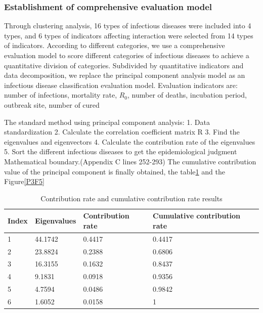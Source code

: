\documentclass[a4paper, 11pt,twoside=true]{scrartcl}
\begin{document}
\subsubsection{Establishment of comprehensive evaluation model}
\qquad Through clustering analysis, 16 types of infectious diseases were included into 4 types, and 6 types of indicators affecting interaction were selected from 14 types of indicators. According to different categories, we use a comprehensive evaluation model to score different categories of infectious diseases to achieve a quantitative division of categories. Subdivided by quantitative indicators and data decomposition, we replace the principal component analysis model as an infectious disease classification evaluation model. Evaluation indicators are: number of infections, mortality rate, $R_0$, number of deaths, incubation period, outbreak site, number of cured

\quad The standard method using principal component analysis: 1. Data standardization 2. Calculate the correlation coefficient matrix R 3. Find the eigenvalues and eigenvectors 4. Calculate the contribution rate of the eigenvalues 5. Sort the different infectious diseases to get the epidemiological judgment Mathematical boundary.(Appendix C lines 252-293) The cumulative contribution value of the principal component is finally obtained, the table\ref{P3T5} and the Figure\ref{P3F5}

\begin{table}[H]
	\centering
	\caption{Contribution rate and cumulative contribution rate results} \label{P3T5}
	\begin{tabular}{llll}
		\hline
		\textbf{Index} & \textbf{Eigenvalues} & \textbf{Contribution rate} & \textbf{Cumulative contribution rate} \\ \hline
		1           & 44.1742      & 0.4417       & 0.4417         \\
		2           & 23.8824      & 0.2388       & 0.6806         \\
		3           & 16.3155      & 0.1632       & 0.8437         \\
		4           & 9.1831       & 0.0918       & 0.9356         \\
		5           & 4.7594       & 0.0486       & 0.9842         \\
		6           & 1.6052       & 0.0158       & 1              \\ \hline
	\end{tabular}
\end{table}
\end{document}
